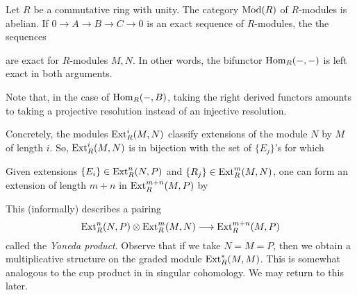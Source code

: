 Let $R$ be a commutative ring with unity. The category $\operatorname{Mod}(R)$ of $R$-modules is abelian. If $0 \to A \to B \to C \to 0$ is an exact sequence of $R$-modules, the the sequences
\begin{center}

\end{center}
are exact for $R$-modules $M, N$. In other words, the bifunctor $\operatorname{Hom}_{R}({-}, {-})$ is left exact in both arguments.

\begin{definition}
    The functors $\Ext_R^i(A, {-})$ (resp. $\Ext_R^i({-}, B)$) are defined to be the right derived functors of $\Hom_R(A, {-})}$ (resp. $\Hom_R({-}, B)}$).
\end{definition}

Note that, in the case of $\operatorname{Hom}_R({-}, B)$, taking the right derived functors amounts to taking a projective resolution instead of an injective resolution.

Concretely, the modules $\operatorname{Ext}_R^i(M, N)$ classify extensions of the module $N$ by $M$ of length $i$. So, $\operatorname{Ext}_R^i(M, N)$ is in bijection with the set of $\{E_j\}$'s for which
\begin{center}
\end{center}

Given extensions $\{E_i\} \in \operatorname{Ext}_R^n(N, P)$ and $\{R_j\} \in \operatorname{Ext}_R^m(M, N)$, one can form an extension of length $m + n$ in $\operatorname{Ext}_R^{m+n}(M, P)$ by
\begin{center}
\end{center}
This (informally) describes a pairing
\[
    \operatorname{Ext}_R^n(N, P) \otimes \operatorname{Ext}_R^m(M, N) \longrightarrow \operatorname{Ext}_R^{m+n}(M, P)
\]
called the \textit{Yoneda product}. Observe that if we take $N=M=P$, then we obtain a multiplicative structure on the graded module $\operatorname{Ext}_R^{\ast}(M, M)$. This is somewhat analogous to the cup product in in singular cohomology. We may return to this later.

